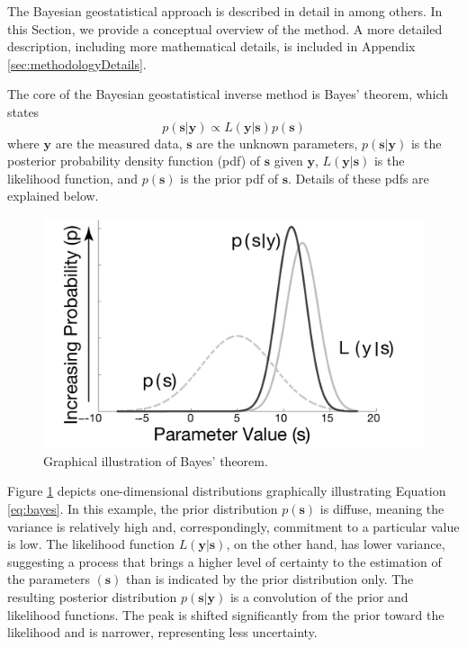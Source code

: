 \documentclass[11pt,oneside,onecolumn]{usgsreport}
\begin{document}
\begin{multicols}{2}
The Bayesian geostatistical approach is described in detail in \citet{KitanidisVomvoris1983,HoeksemaKitanidis1984a,Kitanidis1995,NowakCirpka2004}
among others. In this Section, we provide a conceptual overview of
the method. A more detailed description, including more mathematical
details, is included in Appendix \ref{sec:methodologyDetails}.

The core of the Bayesian geostatistical inverse method is Bayes' theorem,
which states
\begin{equation}
p(\mathbf{s|y})\propto L(\mathbf{y|s})p(\mathbf{s})\label{eq:bayes}
\end{equation}
 where \textbf{$\mathbf{y}$} are the measured data, $\mathbf{s}$
are the unknown parameters, $p(\mathbf{s|y})$ is the posterior probability
density function (pdf) of $\mathbf{s}$ given $\mathbf{y}$, $L(\mathbf{y|s})$
is the likelihood function, and $p(\mathbf{s})$ is the prior pdf
of $\mathbf{s}$. Details of these pdfs are explained below. 

\begin{figure}[H]
\begin{centering}
\includegraphics[scale=0.55]{figures/normals}
\par\end{centering}

\caption{\label{fig:normals}Graphical illustration of Bayes' theorem.}
\end{figure}


Figure \ref{fig:normals} depicts one-dimensional distributions graphically
illustrating Equation \ref{eq:bayes}. In this example, the prior
distribution $p\left(\mathbf{s}\right)$ is diffuse, meaning the variance
is relatively high and, correspondingly, commitment to a particular
value is low. The likelihood function $L\left(\mathbf{y|s}\right)$,
on the other hand, has lower variance, suggesting a process that brings
a higher level of certainty to the estimation of the parameters $\left(\mathbf{s}\right)$
than is indicated by the prior distribution only. The resulting posterior
distribution $p\left(\mathbf{s|y}\right)$ is a convolution of the
prior and likelihood functions. The peak is shifted significantly
from the prior toward the likelihood and is narrower, representing
less uncertainty.


\end{multicols}
\end{document}
